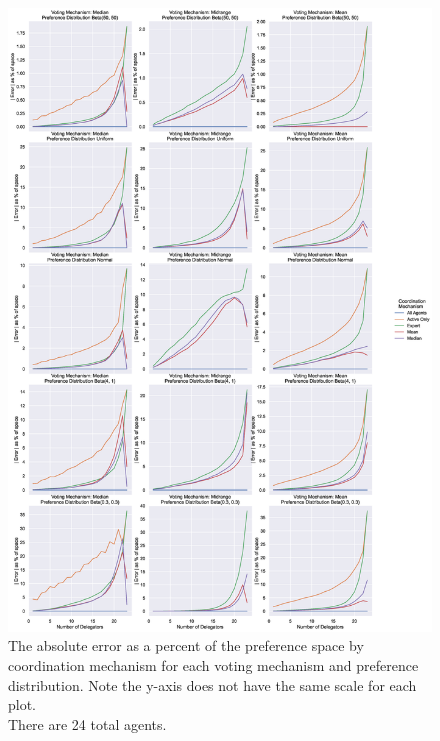 \begin{figure}[p]
    \centering
    \includegraphics[scale=0.30]
    {content/chapter2/figures/distribution_different_scale_error_as_percent_of_space_abs_mean}
    \caption{
        The absolute error as a percent of the preference space by coordination
        mechanism for each voting mechanism and preference distribution.
        Note the y-axis does not have the same scale for each plot.
        \\
        There are 24 total agents.
    }
    \label{fig:distribution-different-scale-error-as-percent-of-space-abs-mean}
\end{figure}

